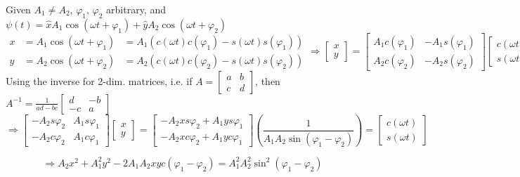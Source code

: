 \documentclass[twoside,10pt]{amsart}
\newcommand{\problemhead}[1]
  {\smallskip
   \noindent{\large\bf Problem #1.}
   \smallskip}
\begin{document}
\problemhead{8.1} Given $A_1 \neq A_2$, $\varphi_1, \, \varphi_2$ arbitrary, and $\psi(t) = \hat{x} A_1 \cos{ (\omega t+ \varphi_1) } + \hat{y} A_2 \cos{( \omega t + \varphi_2) }$
\[
\begin{aligned}
  x & = A_1 \cos{(\omega t+ \varphi_1) } & = A_1 ( c(\omega t)c(\varphi_1) - s(\omega t)s(\varphi_1)  ) \\
  y & = A_2 \cos{(\omega t + \varphi_2) } & = A_2 (c(\omega t)c(\varphi_2) - s(\omega t)s(\varphi_2 ) ) 
\end{aligned} \Longrightarrow \left[ \begin{matrix} x \\ y \end{matrix} \right] = \left[ \begin{matrix} A_1 c(\varphi_1)  & -A_1 s(\varphi_1) \\ A_2 c(\varphi_2)  & -A_2 s(\varphi_2) \end{matrix} \right] \left[ \begin{matrix} c(\omega t) \\ s(\omega t)  \end{matrix} \right]
\]
Using the inverse for 2-dim. matrices, i.e. if $ A = \left[ \begin{matrix} a & b \\ c & d \end{matrix} \right]$, then $A^{-1} = \frac{1}{ad - bc} \left[ \begin{matrix} d & -b \\ -c & a \end{matrix} \right]$  
\[
\Longrightarrow \left[ \begin{matrix} -A_2 s\varphi_2 & A_1 s\varphi_1 \\ -A_2 c\varphi_2 & A_1 c\varphi_1 \end{matrix} \right] \left[ \begin{matrix} x \\ y \end{matrix} \right] = \left[ \begin{matrix} -A_2 x s\varphi_2 + A_1 y s\varphi_1 \\ -A_2 x c\varphi_2 + A_1 y c\varphi_1 \end{matrix} \right] \left( \frac{1}{ A_1 A_2 \sin{(\varphi_1 - \varphi_2) }} \right) = \left[ \begin{matrix} c(\omega t) \\ s(\omega t) \end{matrix} \right]
\]

\[
\Longrightarrow A_2 x^2 + A_1^2 y^2 - 2A_1 A_2 xy c( \varphi_1 - \varphi_2) = A_1^2 A_2^2 \sin^2{(\varphi_1 - \varphi_2 )}
\]
\end{document}

